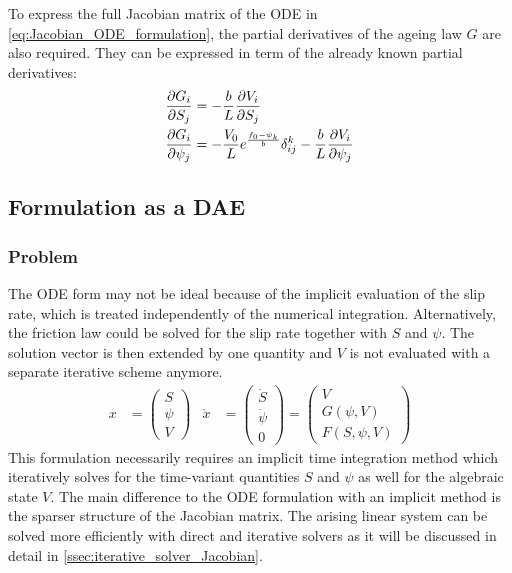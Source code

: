 To express the full Jacobian matrix of the ODE in \autoref{eq:Jacobian_ODE_formulation}, the partial derivatives of the ageing law $G$ are also required. They can be expressed in term of the already known partial derivatives: 
\begin{align}
	\pdv{G_i}{S_j}    &= -\frac{b}{L}\pdv{V_i}{S_j} \\
	\pdv{G_i}{\psi_j} &= -\frac{V_0}{L}e^{\frac{f_0 - \psi_k}{b}}\delta_{ij}^k -
						  \frac{b}{L}\pdv{V_i}{\psi_j}
\end{align}



\subsection{Formulation as a DAE}
\label{ssec:444SEAS__extendedDAE}
\subsubsection{Problem}
The ODE form may not be ideal because of the implicit evaluation of the slip rate, which is treated independently of the numerical integration. Alternatively, the friction law could be solved for the slip rate together with $S$ and $\psi$. The solution vector is then extended by one quantity and $V$ is not evaluated with a separate iterative scheme anymore.
\begin{align}
	\label{eq:DAE_formulation_SEAS}
	x &= \begin{pmatrix}
			S \\ \psi \\ V
		 \end{pmatrix} & \dot{x} &= \begin{pmatrix}
										\dot{S} \\ \dot{\psi} \\ 0
									\end{pmatrix} = \begin{pmatrix}
										V \\ G(\psi, V) \\ F(S,\psi,V)
									\end{pmatrix}
\end{align}
This formulation necessarily requires an implicit time integration method which iteratively solves for the time-variant quantities $S$ and $\psi$ as well for the algebraic state $V$. The main difference to the ODE formulation with an implicit method is the sparser structure of the Jacobian matrix. The arising linear system can be solved more efficiently with direct and iterative solvers as it will be discussed in detail in \autoref{ssec:iterative_solver_Jacobian}. \\
